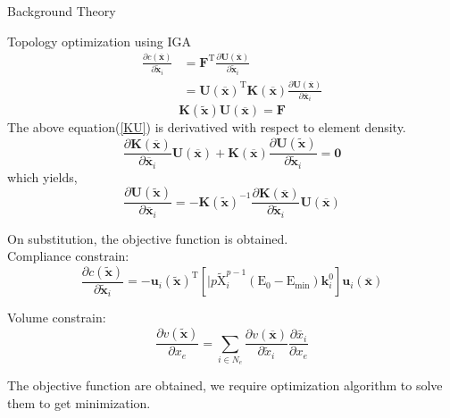 \documentclass[a4paper,12pt,times]{article}
\begin{document}
\begin{section}{Background Theory}
\begin{subsection}{Topology optimization using IGA}
\begin{equation}
\begin{aligned}
\frac{\partial c(\overline{\mathbf{x}})}{\partial \tilde{\mathbf{x}}_{i}} &=\mathbf{F}^{\mathrm{T}} \frac{\partial \mathbf{U}(\overline{\mathbf{x}})}{\partial \tilde{\mathbf{x}}_{i}} \\
&=\mathbf{U}(\overline{\mathbf{x}})^{\mathrm{T}} \mathbf{K}(\overline{\mathbf{x}}) \frac{\partial \mathbf{U}(\overline{\mathbf{x}})}{\partial \overline{\mathbf{x}}_{i}}
\end{aligned}
\end{equation}
\begin{equation}\label{KU}
\mathbf{K}(\tilde{\mathbf{x}}) \mathbf{U}(\overline{\mathbf{x}})=\mathbf{F}
\end{equation}
The above equation(\ref{KU}) is derivatived with respect to element density.
\begin{equation}
\frac{\partial \mathbf{K}(\overline{\mathbf{x}})}{\partial \overline{\mathbf{x}}_{i}} \mathbf{U}(\overline{\mathbf{x}})+\mathbf{K}(\overline{\mathbf{x}}) \frac{\partial \mathbf{U}(\tilde{\mathbf{x}})}{\partial \tilde{\mathbf{x}}_{i}}=\mathbf{0}
\end{equation}
which yields,
\begin{equation}
\frac{\partial \mathbf{U}(\tilde{\mathbf{x}})}{\partial \overline{\mathbf{x}}_{i}}=-\mathbf{K}(\tilde{\mathbf{x}})^{-1} \frac{\partial \mathbf{K}(\overline{\mathbf{x}})}{\partial \tilde{\mathbf{x}}_{i}} \mathbf{U}(\overline{\mathbf{x}})
\end{equation}

On substitution, the objective function is obtained.\\
Compliance constrain:
\begin{equation}
\frac{\partial c(\tilde{\mathbf{x}})}{\partial \tilde{\mathbf{x}}_{i}}=-\mathbf{u}_{i}(\tilde{\mathbf{x}})^{\mathrm{T}}\left[\mid p \tilde{\mathrm{X}}_{i}^{p-1}\left(\mathrm{E}_{0}-\mathrm{E}_{\min }\right) \mathbf{k}_{i}^{0}\right] \mathbf{u}_{i}(\overline{\mathbf{x}})
\end{equation}

Volume constrain:
\begin{equation}
\frac{\partial v(\tilde{\mathbf{x}})}{\partial x_{e}}=\sum_{i \in N_{e}} \frac{\partial v(\overline{\mathbf{x}})}{\partial \tilde{x}_{i}} \frac{\partial \bar{x}_{i}}{\partial x_{e}}
\end{equation}

The objective function are obtained, we require optimization algorithm to solve them to get minimization. 

\end{subsection}
\end{section}
\end{document}
